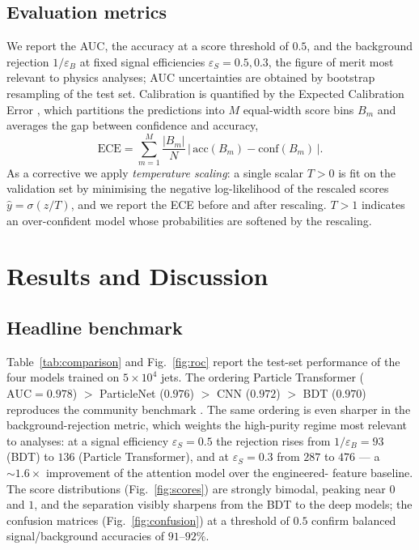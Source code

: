 \documentclass[preprint,12pt]{elsarticle}
\begin{document}
\subsection{Evaluation metrics}
\label{sec:metrics}
We report the AUC, the accuracy at a score threshold of $0.5$, and the
background rejection $1/\varepsilon_B$ at fixed signal efficiencies
$\varepsilon_S=0.5,0.3$, the figure of merit most relevant to physics
analyses; AUC uncertainties are obtained by bootstrap resampling of the test
set. Calibration is quantified by the Expected Calibration Error
\citep{guo2017calibration}, which partitions the predictions into $M$
equal-width score bins $B_m$ and averages the gap between confidence and
accuracy,
\begin{equation}
\mathrm{ECE} = \sum_{m=1}^{M}\frac{|B_m|}{N}\,
\bigl|\,\mathrm{acc}(B_m)-\mathrm{conf}(B_m)\,\bigr|.
\label{eq:ece}
\end{equation}
As a corrective we apply \emph{temperature scaling}: a single scalar $T>0$ is
fit on the validation set by minimising the negative log-likelihood of the
rescaled scores $\hat{y}=\sigma(z/T)$, and we report the ECE before and after
rescaling. $T>1$ indicates an over-confident model whose probabilities are
softened by the rescaling.

\section{Results and Discussion}
\label{sec:results}

\subsection{Headline benchmark}
\label{sec:res-headline}
Table~\ref{tab:comparison} and Fig.~\ref{fig:roc} report the test-set
performance of the four models trained on $5\times10^{4}$ jets. The ordering
Particle Transformer ($\mathrm{AUC}=0.978$) $>$ ParticleNet ($0.976$) $>$ CNN
($0.972$) $>$ BDT ($0.970$) reproduces the community benchmark
\citep{kasieczka2019landscape}. The same ordering is even sharper in the
background-rejection metric, which weights the high-purity regime most
relevant to analyses: at a signal efficiency $\varepsilon_S=0.5$ the
rejection rises from $1/\varepsilon_B=93$ (BDT) to $136$ (Particle
Transformer), and at $\varepsilon_S=0.3$ from $287$ to $476$ --- a
$\sim\!1.6\times$ improvement of the attention model over the engineered-
feature baseline. The score distributions (Fig.~\ref{fig:scores}) are
strongly bimodal, peaking near $0$ and $1$, and the separation visibly
sharpens from the BDT to the deep models; the confusion matrices
(Fig.~\ref{fig:confusion}) at a threshold of $0.5$ confirm balanced
signal/background accuracies of $91$--$92\%$.
\end{document}
